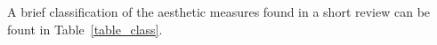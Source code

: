 \documentclass[conference]{IEEEtran}
\begin{document}
A brief classification of the aesthetic measures found in a short review can be fount in Table~\ref{table_class}.

%
%
%
%
%
\end{document}
